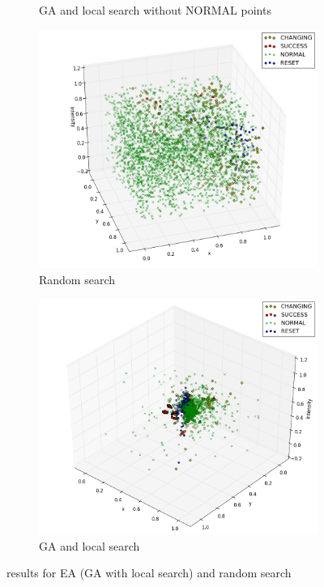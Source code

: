 \documentclass[times, utf8, diplomski]{fer}
\begin{document}
\begin{figure}
\begin{subfigure}[b]{0.49\textwidth}
		\caption{GA and local search without NORMAL points}
		\label{fig:ga2}
	\end{subfigure}
	\begin{subfigure}[b]{0.49\textwidth}
		\includegraphics[width=0.98\linewidth]{images/plots/plot_random_3D.png}
		\caption{Random search}
		\label{fig:random3}
	\end{subfigure}
	\begin{subfigure}[b]{0.49\textwidth}
		\includegraphics[width=0.98\linewidth]{images/plots/plot_GA_3_3D.png}
		\caption{GA and local search}
		\label{fig:ga3}
	\end{subfigure}
	\label{fig:figures}
	\caption{results for EA (GA with local search) and random search}
\end{figure}
\end{document}
